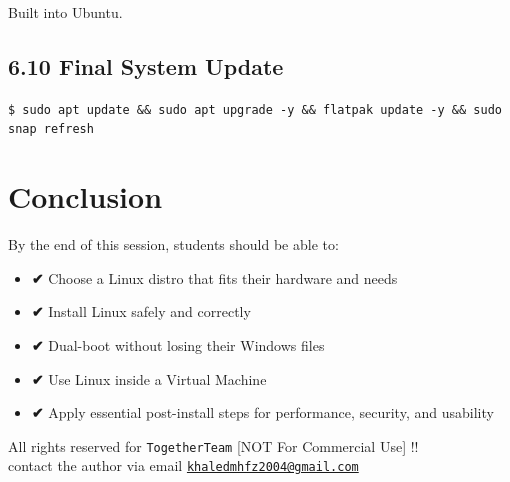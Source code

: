 \documentclass[12pt]{article}
\begin{document}
Built into Ubuntu.

\subsection*{6.10 Final System Update}

\begin{highlightbox}
\texttt{\$ sudo apt update \&\& sudo apt upgrade -y \&\& flatpak update -y \&\& sudo snap refresh}
\end{highlightbox}

\section*{Conclusion}

By the end of this session, students should be able to:

\begin{highlightbox}
\begin{itemize}
    \item \textbf{✔} Choose a Linux distro that fits their hardware and needs
    \item \textbf{✔} Install Linux safely and correctly
    \item \textbf{✔} Dual-boot without losing their Windows files
    \item \textbf{✔} Use Linux inside a Virtual Machine
    \item \textbf{✔} Apply essential post-install steps for performance, security, and usability
\end{itemize}
\end{highlightbox}

\vspace{\fill}
\begin{center}
\color{muted}
All rights reserved for \texttt{TogetherTeam} [NOT For Commercial Use] !!\\
contact the author via email \href{mailto:khaledmhfz2004@gmail.com}{\texttt{khaledmhfz2004@gmail.com}}
\end{center}
\end{document}
